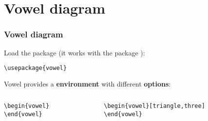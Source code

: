 \section{Vowel diagram}

\begin{frame}[fragile]
\frametitle{Vowel diagram}

Load the package  (it works with the package ):

\begin{lstlisting}
\usepackage{vowel}
\end{lstlisting}

\pause 
\bigskip

Vowel provides a \textbf{ environment} with different \textbf{options}:

\begin{columns}

\begin{column}{.40\textwidth}

\begin{lstlisting}
\begin{vowel}
\end{vowel}
\end{lstlisting}

\begin{figure}
	\centering	
	\begin{vowel}
	\end{vowel}
\end{figure}

\end{column}
\begin{column}{.5\textwidth}

\begin{lstlisting}
\begin{vowel}[triangle,three]
\end{vowel}
\end{lstlisting}

\begin{figure}
	\centering	
	\begin{vowel}
	\end{vowel}
\end{figure}\end{column}

\end{columns}

\end{frame}


